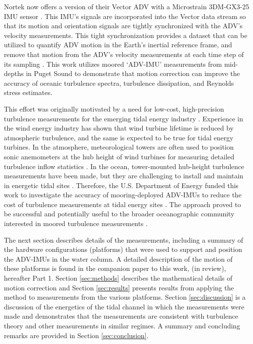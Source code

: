 Nortek now offers a version of their Vector ADV with a Microstrain 3DM-GX3-25 IMU sensor \cite[]{vector_manual2005, MicroStrain2012a}. This IMU's signals are incorporated into the Vector data stream so that its motion and orientation signals are tightly synchronized with the ADV's velocity measurements. This tight synchronization provides a dataset that can be utilized to quantify ADV motion in the Earth's inertial reference frame, and remove that motion from the ADV's velocity measurements at each time step of its sampling \cite[]{Edson++1998}. This work utilizes moored `ADV-IMU' measurements from mid-depths in Puget Sound to demonstrate that motion correction can improve the accuracy of oceanic turbulence spectra, turbulence dissipation, and Reynolds stress estimates.

This effort was originally motivated by a need for low-cost, high-precision turbulence measurements for the emerging tidal energy industry \cite[]{Mccaffrey++2015, Alexander+Hamlington2015}. Experience in the wind energy industry has shown that wind turbine lifetime is reduced by atmospheric turbulence, and the same is expected to be true for tidal energy turbines. In the atmosphere, meteorological towers are often used to position sonic anemometers at the hub height of wind turbines for measuring detailed turbulence inflow statistics \cite[]{Hand++2003, Kelley++2005, Mucke++2011, Afgan++2013}. In the ocean, tower-mounted hub-height turbulence measurements have been made, but they are challenging to install and maintain in energetic tidal sites \cite[]{Gunawan++2014,Thomson++2012}. Therefore, the U.S. Department of Energy funded this work to investigate the accuracy of mooring-deployed ADV-IMUs to reduce the cost of turbulence measurements at tidal energy sites \cite[]{Kilcher++2016}. The approach proved to be successful and potentially useful to the broader oceanographic community interested in moored turbulence measurements \cite[]{Lueck+Huang1999, Doherty++1999, Nash++2004, Perlin+Moum2012, Alford2010, Paskyabi+Fer2013}.

The next section describes details of the measurements, including a summary of the hardware configurations (platforms) that were used to support and position the ADV-IMUs in the water column. A detailed description of the motion of these platforms is found in the companion paper to this work, \citeauthor{Harding++2017} (in review), hereafter Part 1. Section \ref{sec:methods} describes the mathematical details of motion correction and Section \ref{sec:results} presents results from applying the method to measurements from the various platforms. Section \ref{sec:discussion} is a discussion of the energetics of the tidal channel in which the measurements were made and demonstrates that the measurements are consistent with turbulence theory and other measurements in similar regimes. A summary and concluding remarks are provided in Section \ref{sec:conclusion}.



